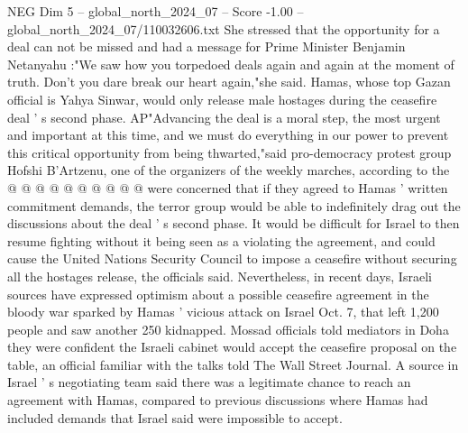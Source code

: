 \begin{textsample}{NEG Dim 5 – global\_north\_2024\_07 – Score -1.00 – global\_north\_2024\_07/110032606.txt}
She stressed that the opportunity for a deal can not be missed and had a message for Prime Minister Benjamin Netanyahu :"We saw how you torpedoed deals again and again at the moment of truth.
Don't you dare break our heart again,"she said.
Hamas, whose top Gazan official is Yahya Sinwar, would only release male hostages during the ceasefire deal ' s second phase.
AP"Advancing the deal is a moral step, the most urgent and important at this time, and we must do everything in our power to prevent this critical opportunity from being thwarted,"said pro-democracy protest group Hofshi B'Artzenu, one of the organizers of the weekly marches, according to the @ @ @ @ @ @ @ @ @ @ were concerned that if they agreed to Hamas ' written commitment demands, the terror group would be able to indefinitely drag out the discussions about the deal ' s second phase.
It would be difficult for Israel to then resume fighting without it being seen as a violating the agreement, and could cause the United Nations Security Council to impose a ceasefire without securing all the hostages release, the officials said.
Nevertheless, in recent days, Israeli sources have expressed optimism about a possible ceasefire agreement in the bloody war sparked by Hamas ' vicious attack on Israel Oct. 7, that left 1,200 people and saw another 250 kidnapped.
Mossad officials told mediators in Doha they were confident the Israeli cabinet would accept the ceasefire proposal on the table, an official familiar with the talks told The Wall Street Journal.
A source in Israel ' s negotiating team said there was a legitimate chance to reach an agreement with Hamas, compared to previous discussions where Hamas had included demands that Israel said were impossible to accept.

\end{textsample}
